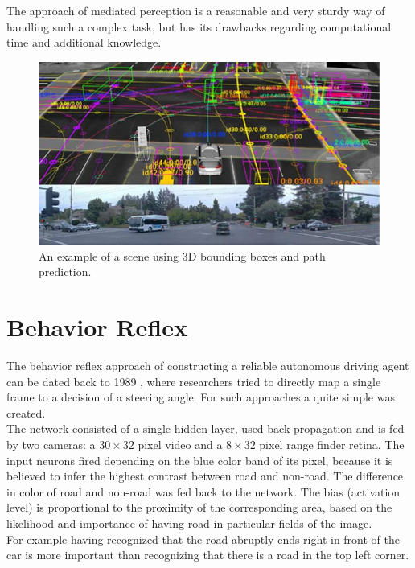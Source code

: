 The approach of mediated perception is a reasonable and very sturdy way of handling such a complex task, but has its drawbacks regarding computational time and additional knowledge.

\begin{figure}
	\centering
	\includegraphics[scale=0.7]{src/pic/intersection.png}
	\caption{An example of a scene using 3D bounding boxes and path prediction.}
	\label{pic: 3D Bounding Box}
\end{figure}

\section{Behavior Reflex}\label{sec: Behavior Reflex}

The behavior reflex approach of constructing a reliable autonomous driving agent can be dated back to 1989 , where researchers tried to directly map a single frame to a decision of a steering angle. For such approaches a quite simple \nn was created. \\
The network \alvinn consisted of a single hidden layer, used back-propagation and is fed by two cameras: a $30\times32$ pixel video and a $8\times32$ pixel range finder retina. The input neurons fired depending on the blue color band of its pixel, because it is believed to infer the highest contrast between road and non-road. The difference in color of road and non-road was fed back to the network. The bias (activation level) is proportional to the proximity of the corresponding area, based on the likelihood and importance of having road in particular fields of the image.\cite{pomerleau1989alvinn}\\
For example having recognized that the road abruptly ends right in front of the car is more important than recognizing that there is a road in the top left corner.\\


